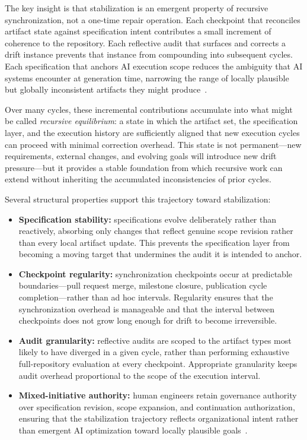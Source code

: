 The key insight is that stabilization is an emergent property of recursive synchronization, not a one-time repair operation. Each checkpoint that reconciles artifact state against specification intent contributes a small increment of coherence to the repository. Each reflective audit that surfaces and corrects a drift instance prevents that instance from compounding into subsequent cycles. Each specification that anchors AI execution scope reduces the ambiguity that AI systems encounter at generation time, narrowing the range of locally plausible but globally inconsistent artifacts they might produce~\cite{Beer1972BrainFirm,Wiener1948Cybernetics}.

Over many cycles, these incremental contributions accumulate into what might be called \textit{recursive equilibrium}: a state in which the artifact set, the specification layer, and the execution history are sufficiently aligned that new execution cycles can proceed with minimal correction overhead. This state is not permanent---new requirements, external changes, and evolving goals will introduce new drift pressure---but it provides a stable foundation from which recursive work can extend without inheriting the accumulated inconsistencies of prior cycles.

Several structural properties support this trajectory toward stabilization:
\begin{itemize}
  \item \textbf{Specification stability:} specifications evolve deliberately rather than reactively, absorbing only changes that reflect genuine scope revision rather than every local artifact update. This prevents the specification layer from becoming a moving target that undermines the audit it is intended to anchor.
  \item \textbf{Checkpoint regularity:} synchronization checkpoints occur at predictable boundaries---pull request merge, milestone closure, publication cycle completion---rather than ad hoc intervals. Regularity ensures that the synchronization overhead is manageable and that the interval between checkpoints does not grow long enough for drift to become irreversible.
  \item \textbf{Audit granularity:} reflective audits are scoped to the artifact types most likely to have diverged in a given cycle, rather than performing exhaustive full-repository evaluation at every checkpoint. Appropriate granularity keeps audit overhead proportional to the scope of the execution interval.
  \item \textbf{Mixed-initiative authority:} human engineers retain governance authority over specification revision, scope expansion, and continuation authorization, ensuring that the stabilization trajectory reflects organizational intent rather than emergent AI optimization toward locally plausible goals~\cite{Shneiderman2020HCAI,Amershi2014InteractiveML}.
\end{itemize}

